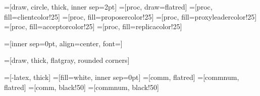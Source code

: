 =[draw, circle, thick, inner sep=2pt]
=[proc, draw=flatred]
=[proc, fill=clientcolor!25]
=[proc, fill=proposercolor!25]
=[proc, fill=proxyleadercolor!25]
=[proc, fill=acceptorcolor!25]
=[proc, fill=replicacolor!25]

=[inner sep=0pt, align=center, font=\small]

=[draw, thick, flatgray, rounded corners]

=[-latex, thick]
=[fill=white, inner sep=0pt]
=[comm, flatred]
=[commnum, flatred]
=[comm, black!50]
=[commnum, black!50]

